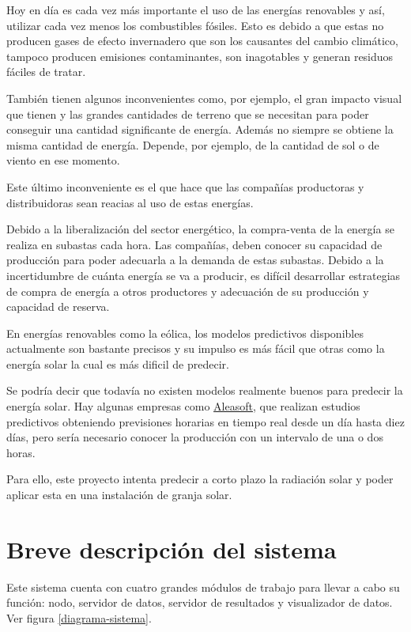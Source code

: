 Hoy en día es cada vez más importante el uso de las energías renovables y así, utilizar cada vez menos los combustibles fósiles. Esto es debido a que estas no producen gases de efecto invernadero que son los causantes del cambio climático, tampoco producen emisiones contaminantes, son inagotables y generan residuos fáciles de tratar.

También tienen algunos inconvenientes como, por ejemplo, el gran impacto visual que tienen y las grandes cantidades de terreno que se necesitan para poder conseguir una cantidad significante de energía. Además no siempre se obtiene la misma cantidad de energía. Depende, por ejemplo, de la cantidad de sol o de viento en ese momento.

Este último inconveniente es el que hace que las compañías productoras y distribuidoras sean reacias al uso de estas energías.

Debido a la liberalización del sector energético, la compra-venta de la energía se realiza en subastas cada hora. Las compañías, deben conocer su capacidad de producción para poder adecuarla a la demanda de estas subastas. Debido a la incertidumbre de cuánta energía se va a producir, es difícil desarrollar estrategias de compra de energía a otros productores y adecuación de su producción y capacidad de reserva.

En energías renovables como la eólica, los modelos predictivos disponibles actualmente son bastante precisos y su impulso es más fácil que otras como la energía solar la cual es más dificil de predecir.

Se podría decir que todavía no existen modelos realmente buenos para predecir la energía solar. Hay algunas empresas como \href{https://aleasoft.com/es/}{Aleasoft}, que realizan estudios predictivos obteniendo previsiones horarias en tiempo real desde un día hasta diez días, pero sería necesario conocer la producción con un intervalo de una o dos horas.

Para ello, este proyecto intenta predecir a corto plazo la radiación solar y poder aplicar esta en una instalación de granja solar.

\section{Breve descripción del sistema}
\label{makereference1.2}

Este sistema cuenta con cuatro grandes módulos de trabajo para llevar a cabo su función: nodo, servidor de datos, servidor de resultados y visualizador de datos. Ver figura \ref{diagrama-sistema}.

